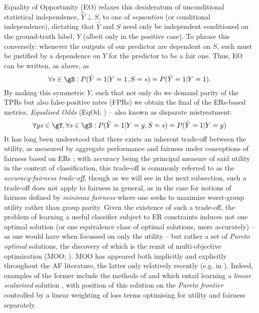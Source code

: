 %
%
Equality of Opportunity (EO) relaxes this desideratum of unconditional statistical independence,
\(\hat{Y} \perp S\), to one of \emph{separation} (or conditional independence), dictating that
\(\hat{Y}\) and \(S\) need only be independent conditioned on the ground-truth label, \(Y\) (albeit
only in the positive case).
%
To phrase this conversely: whenever the outputs of our predictor are dependent on \(S\), such must be
justified by a dependence on \(Y\) for the predictor to be a fair one.
%
Thus, EO can be written, as above, as
%
\begin{equation}
    \forall s \in \gS: P( \hat{Y}=1|Y=1, S=s ) = P(\hat{Y}=1|Y=1).
\end{equation}
%
%
By making this symmetric \wrt{} \(Y\), such that not only do we demand parity of the TPRs but also
false-positive rates (FPRs) we obtain the final of the ERs-based metrics, \emph{Equalised Odds}
(EqOd; \cite{hardt2016equality}) -- also known as disparate mistreatment:
%
\begin{equation}
    \forall y s \in \gY, \forall s \in \gS: P( \hat{Y}=1|Y=y, S=s ) = P( \hat{Y}=1|Y=y )
\end{equation}
%
%
It has long been understood that there exists an inherent trade-off between the utility, as
measured by aggregate performance and fairness under conceptions of fairness based on ERs
\citep{kaplow1999conflict}; with accuracy being the principal measure of said utility in the
context of classification, this trade-off is commonly referred to as the \emph{accuracy-fairness
trade-off}, though as we will see in the next subsection, such a trade-off does not apply to
fairness in general, as in the case for notions of fairness defined by \emph{minimax fairness}
where one seeks to maximise worst-group utility rather than group parity.
%
Given the existence of such a trade-off, the problem of learning a useful classifier subject to ER
constraints induces not one optimal solution (or one equivalence class of optimal solutions, more
accurately) -- as one would have when focussed on only the utility -- but rather a set of
\emph{Pareto optimal} solutions, the discovery of which is the remit of multi-objective
optimisation (MOO; \cite{sawaragi1985theory, deb2013multi}). 
%
MOO has appeared both implicitly and explicitly throughout the AF literature, the latter only
relatively recently (e.g. in \cite{navon2020learning}). 
%
Indeed, examples of the former include the methods of \cite{louizos2015variational} and
\cite{madras2018learning} which entail learning a \emph{linear scalarised} solution
\citep{boyd2004convex},  with position of this solution on the \emph{Pareto frontier} controlled by
a linear weighting of loss terms optimising for utility and fairness separately.
%
